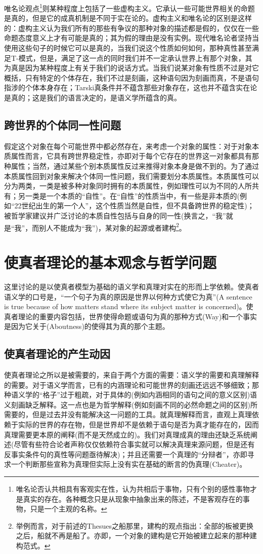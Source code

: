 \documentclass{article}
\begin{document}
唯名论观点\footnote{唯名论否认共相具有客观实在性，认为共相后于事物，只有个别的感性事物才是真实的存在。各种概念只是从现象中抽象出来的陈述，不是客观存在的事物，只是一个主观的名称。}则某种程度上包括了一些虚构主义。它承认一些可能世界相关的命题是真的，但是它的成真机制是不同于实在论的。虚构主义和唯名论的区别是这样的：虚构主义认为我们所有的那些有争议的那种对象的描述都是假的，仅仅在一些命题态度意义上才有可能是真的；其为假的理由是没有实例。现代唯名论者坚持当使用这些句子的时候它可以是真的，当我们说这个性质如何如何，那种真性甚至满足T-模式，但是，满足了这一点的同时我们并不一定承认世界上有那个对象，其为真是因为某种程度上有关于我们的说话方式。当我们说某对象有性质不过是对它概括，只有特定的个体存在，我们不过是刻画，这种语句因为刻画而真，不是语句指涉的个体本身存在；Tarski真条件并不蕴含那些对象存在，这也并不蕴含实在论是真的；这是我们的语言决定的，是语义学所蕴含的真。

\subsection{跨世界的个体同一性问题}
假定这个对象在每个可能世界中都必然存在，来考虑一个对象的属性：对于对象本质属性而言，它具有跨世界稳定性，亦即对于每个它存在的世界这一对象都具有那种属性；当然，通过某些个别本质属性反过来推得对象本身是做不到的。为了通过本质属性回到对象来解决个体同一性问题，我们需要划分本质属性。本质属性可以分为两类，一类是被多种对象同时拥有的本质属性，例如理性可以为不同的人所共有；另一类是一个本质的“自性”。在“自性”的性质当中，有一些是非本质的(例如“22世纪出生的第一个人”，这个性质当然是自性，但不具备跨世界的稳定性)；被哲学家建议并广泛讨论的本质自性包括与自身的同一性(换言之，“我”就是“我”，而别人不能成为“我”)，某对象的起源或者建构\footnote{举例而言，对于前述的Thesues之船那里，建构的观点指出：全部的板被更换之后，船就不再是船了。亦即，一个对象的建构是它开始被建立起来的那种建构范式。}。
\section{使真者理论的基本观念与哲学问题}
这里讨论的是以使真者模型为基础的语义学和真理对实在的形而上学依赖。使真者语义学的口号是，“一个句子为真的原因是世界以何种方式使它为真”(A sentence is true because of how matters stand where its subject matter is concerned)。使真者理论的重要内容包括，世界使得命题或语句为真的那种方式(Way)和一个事实是因为它关于(Aboutness)的使得其为真的那个主题。
\subsection{使真者理论的产生动因}
使真者理论之所以是被需要的，来自于两个方面的需要：语义学的需要和真理解释的需要。对于语义学而言，已有的内涵理论和可能世界的刻画还远远不够细致；那种语义学的“格子”过于粗疏，对于具体的(例如内涵相同的语句之间的意义区别)语义刻画缺乏解释。这一点也是为哲学解释(例如刻画不同的必然命题之间的区别)所需要的，但是过去并没有能解决这一问题的工具。就真理解释而言，直观上真理依赖于实际的世界的存在物，但是世界却不是依赖于语句是否为真才能存在的，因而真理需要更本原的阐释(而不是天然成立的)。我们对真理成真的理由还缺乏系统阐述(尽管有些符合论者声称仅仅依赖符合事实就可以解决真理来源问题，但是还有反事实条件句的真性等问题亟待解决)；并且还需要一个真理的“分辩者”，亦即寻求一个判断那些宣称为真理但实际上没有实在基础的断言的伪真理(Cheater)。
\end{document}
